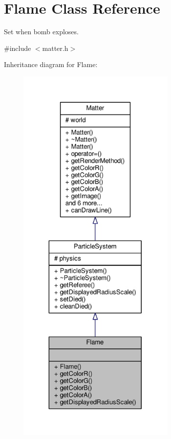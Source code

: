 \hypertarget{classFlame}{}\section{Flame Class Reference}
\label{classFlame}


Set when bomb exploses.  




{\ttfamily \#include $<$matter.\+h$>$}



Inheritance diagram for Flame\+:\nopagebreak
\begin{figure}[H]
\begin{center}
\leavevmode
\includegraphics[height=550pt]{classFlame__inherit__graph}
\end{center}
\end{figure}


